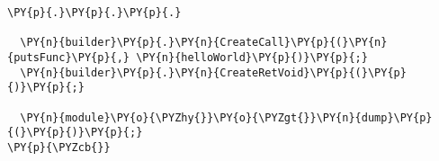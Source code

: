 \begin{Verbatim}[commandchars=\\\{\}]
          \PY{p}{.}\PY{p}{.}\PY{p}{.}

  \PY{n}{builder}\PY{p}{.}\PY{n}{CreateCall}\PY{p}{(}\PY{n}{putsFunc}\PY{p}{,} \PY{n}{helloWorld}\PY{p}{)}\PY{p}{;}
  \PY{n}{builder}\PY{p}{.}\PY{n}{CreateRetVoid}\PY{p}{(}\PY{p}{)}\PY{p}{;}

  \PY{n}{module}\PY{o}{\PYZhy{}}\PY{o}{\PYZgt{}}\PY{n}{dump}\PY{p}{(}\PY{p}{)}\PY{p}{;}
\PY{p}{\PYZcb{}}
\end{Verbatim}
